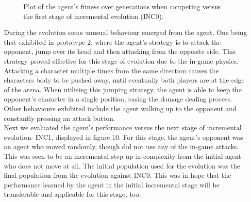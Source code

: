 \documentclass[12pt,a4paper]{article}
\begin{document}
\begin{figure}[h]
\begin{center}
\caption{Plot of the agent's fitness over generations when competing versus the first stage of incremental evolution (INC0).}
\end{center}
\end{figure}
\newpage
During the evolution some unusual behaviour emerged from the agent. One being that exhibited in prototype 2, where the agent's strategy is to attack the opponent, jump over its head and then attacking from the opposite side. This strategy proved effective for this stage of evolution due to the in-game physics. Attacking a character multiple times from the same direction causes the characters body to be pushed away, until eventually both players are at the edge of the arena. When utilising this jumping strategy, the agent is able to keep the opponent's character in a single position, easing the damage dealing process. Other behaviours exhibited include the agent walking up to the opponent and constantly pressing an attack button.\\

Next we evaluated the agent's performance versus the next stage of incremental evolution- INC1, displayed in figure 10. For this stage, the agent's opponent was an agent who moved randomly, though did not use any of the in-game attacks. This was seen to be an incremental step up in complexity from the initial agent who does not move at all. The initial population used for the evolution was the final population from the evolution against INC0. This was in hope that the performance learned by the agent in the initial incremental stage will be transferable and applicable for this stage, too.\\
\end{document}
